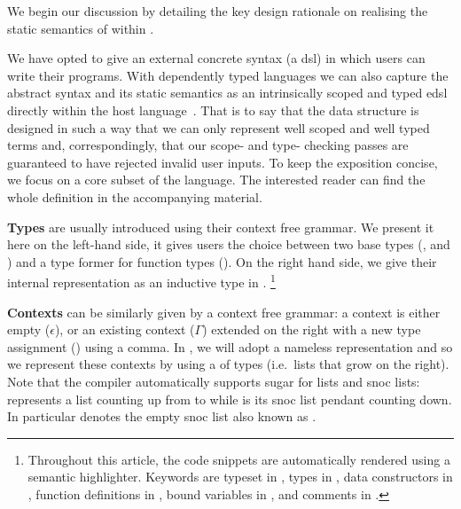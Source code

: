 We begin our discussion by detailing the key design rationale on
realising the static semantics of \Velo{} within \Idris{}.

We have opted to give \Velo{} an external concrete syntax (a \ac{dsl})
in which users can write their programs.
%
With dependently typed languages we can also capture
the abstract syntax and its static semantics as an intrinsically
scoped and typed \ac{edsl}
directly within the host language~\cite{Augustsson1999edt}.
%
That is to say that the data structure is designed in such a way that
we can only represent well scoped and well typed terms and, correspondingly,
that our scope- and type- checking passes are guaranteed to have rejected
invalid user inputs.
%
To keep the exposition concise, we focus on a core subset of the
language. The interested reader can find the whole definition
in the accompanying material.

\textbf{Types} are usually introduced using their context free grammar.
%
We present it here on the left-hand side, it gives users the choice between
two base types (\TyNat, and \TyBool) and a type former for function types
(\TyFunc{\cdot}{\cdot}).
%
On the right hand side, we give their internal representation as an inductive
type in \Idris{}.%
\footnote{
Throughout this article, the \Idris{} code snippets are
automatically rendered using a semantic highlighter.
%
Keywords are typeset in ,
types in ,
data constructors in ,
function definitions in ,
bound variables in ,
and comments in .
}

\begin{center}
\begin{minipage}{0.45\textwidth}
\syntaxtypes
\end{minipage}\hfill
\begin{minipage}{0.45\textwidth}
\end{minipage}
\end{center}

\textbf{Contexts} can be similarly given by a context free grammar:
a context is either empty ($\epsilon$), or an existing context ($\Gamma$)
extended on the right with a new type assignment () using a comma.
%
In \Idris{}, we will adopt a nameless representation and so we represent
these contexts by using a  of types
(i.e.\ lists that grow on the right).
%
Note that the \Idris{} compiler automatically supports sugar for lists and
snoc lists: \IdrisData{[1,2,3]} represents a list counting up from
 to  while \IdrisData{[<1,2,3]} is its snoc list
pendant counting down.
%
In particular \IdrisData{[<]} denotes the empty snoc list also known as .

